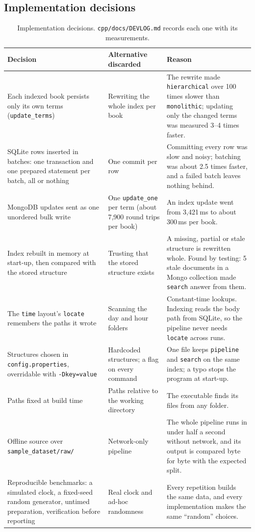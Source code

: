 \documentclass[11pt,a4paper]{article}
\newcommand{\code}[1]{\texttt{#1}}
\begin{document}
\subsection{Implementation decisions}
\begin{table}[H]
\centering\small
\begin{tabularx}{\linewidth}{@{}L{3.9cm} L{3.2cm} Y@{}}
\toprule
Decision & Alternative discarded & Reason \\
\midrule
Each indexed book persists only its own terms (\code{update\_terms}) & Rewriting the whole index per book & The rewrite made \code{hierarchical} over 100 times slower than \code{monolithic}; updating only the changed terms was measured 3--4 times faster. \\
SQLite rows inserted in batches: one transaction and one prepared statement per batch, all or nothing & One commit per row & Committing every row was slow and noisy; batching was about 2.5 times faster, and a failed batch leaves nothing behind. \\
MongoDB updates sent as one unordered bulk write & One \code{update\_one} per term (about 7,900 round trips per book) & An index update went from 3,421\,ms to about 300\,ms per book. \\
Index rebuilt in memory at start-up, then compared with the stored structure & Trusting that the stored structure exists & A missing, partial or stale structure is rewritten whole. Found by testing: 5 stale documents in a Mongo collection made \code{search} answer from them. \\
The \code{time} layout's \code{locate} remembers the paths it wrote & Scanning the day and hour folders & Constant-time lookups. Indexing reads the body path from SQLite, so the pipeline never needs \code{locate} across runs. \\
Structures chosen in \code{config.properties}, overridable with \code{-Dkey=value} & Hardcoded structures; a flag on every command & One file keeps \code{pipeline} and \code{search} on the same index; a typo stops the program at start-up. \\
Paths fixed at build time & Paths relative to the working directory & The executable finds its files from any folder. \\
Offline source over \code{sample\_dataset/raw/} & Network-only pipeline & The whole pipeline runs in under half a second without network, and its output is compared byte for byte with the expected split. \\
Reproducible benchmarks: a simulated clock, a fixed-seed random generator, untimed preparation, verification before reporting & Real clock and ad-hoc randomness & Every repetition builds the same data, and every implementation makes the same ``random'' choices. \\
\bottomrule
\end{tabularx}
\caption{Implementation decisions. \code{cpp/docs/DEVLOG.md} records each one with its measurements.}
\end{table}
\end{document}
